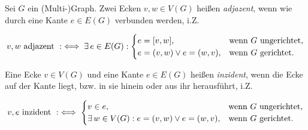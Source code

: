 \begin{definition}

    Sei $G$ ein (Multi-)Graph.
    Zwei Ecken $v, w \in V(G)$ heißen \textit{adjazent}, wenn wie durch eine Kante $e \in E(G)$ verbunden werden, i.Z.

    \begin{align*}
        v, w ~\text{adjazent}~
        :\iff
        \exists \, e \in E(G):
            \begin{cases}
                e = [v, w],                 & \text{wenn}~ G ~\text{ungerichtet}, \\
                e = (v, w) \lor e = (w, v), & \text{wenn}~ G ~\text{gerichtet}.
            \end{cases}
    \end{align*}

    Eine Ecke $v \in V(G)$ und eine Kante $e \in E(G)$ heißen \textit{inzident}, wenn die Ecke auf der Kante liegt, bzw. in sie hinein oder aus ihr herausführt, i.Z.

    \begin{align*}
        v, e ~\text{inzident}~
        :\iff
        \begin{cases}
            v \in e,                                        & \text{wenn}~ G ~\text{ungerichtet}, \\
            \exists \, w \in V(G): e = (v, w) \lor e = (w, v), & \text{wenn}~ G ~\text{gerichtet}.
        \end{cases}
    \end{align*}

\end{definition}

